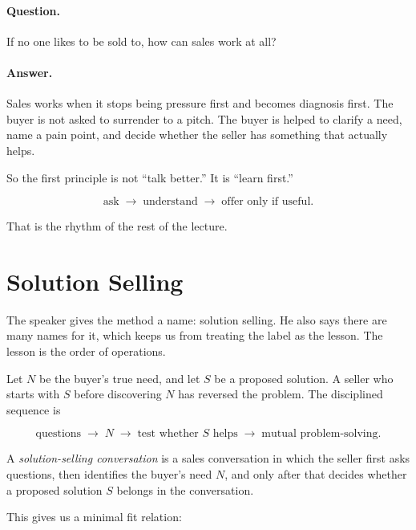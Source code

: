 \paragraph{Question.}
If no one likes to be sold to, how can sales work at all?

\paragraph{Answer.}
Sales works when it stops being pressure first and becomes diagnosis first. The buyer is not asked to surrender to a pitch. The buyer is helped to clarify a need, name a pain point, and decide whether the seller has something that actually helps.

So the first principle is not ``talk better.'' It is ``learn first.''

\begin{equation}
\text{ask}
\;\longrightarrow\;
\text{understand}
\;\longrightarrow\;
\text{offer only if useful}.
\end{equation}

That is the rhythm of the rest of the lecture.

\section{Solution Selling}

The speaker gives the method a name: solution selling. He also says there are many names for it, which keeps us from treating the label as the lesson. The lesson is the order of operations.

Let \(N\) be the buyer's true need, and let \(S\) be a proposed solution. A seller who starts with \(S\) before discovering \(N\) has reversed the problem. The disciplined sequence is

\begin{equation}
\text{questions}
\;\longrightarrow\;
N
\;\longrightarrow\;
\text{test whether } S \text{ helps}
\;\longrightarrow\;
\text{mutual problem-solving}.
\end{equation}

\begin{definition}
A \emph{solution-selling conversation} is a sales conversation in which the seller first asks questions, then identifies the buyer's need \(N\), and only after that decides whether a proposed solution \(S\) belongs in the conversation.
\end{definition}

This gives us a minimal fit relation:

